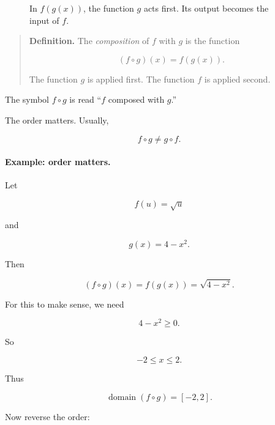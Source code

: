 \begin{figure}[h]
\centering
{}
\caption{In \(f(g(x))\), the function \(g\) acts first. Its output becomes the input of \(f\).}
\label{fig:composition-machine}
\end{figure}

\begin{quote}
\textbf{Definition.}
The \emph{composition} of \(f\) with \(g\) is the function

\[
(f\circ g)(x)=f(g(x)).
\]

The function \(g\) is applied first. The function \(f\) is applied second.
\end{quote}

The symbol \(f\circ g\) is read ``\(f\) composed with \(g\).''

The order matters. Usually,

\[
f\circ g \neq g\circ f.
\]

\paragraph{Example: order matters.}
Let

\[
f(u)=\sqrt{u}
\]

and

\[
g(x)=4-x^2.
\]

Then

\[
(f\circ g)(x)=f(g(x))=\sqrt{4-x^2}.
\]

For this to make sense, we need

\[
4-x^2\ge 0.
\]

So

\[
-2\le x\le 2.
\]

Thus

\[
\operatorname{domain}(f\circ g)=[-2,2].
\]

Now reverse the order:

